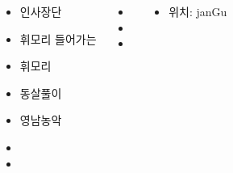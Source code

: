 \documentclass[	20pt, 
							a1paper, 
							portrait, %
							margin=0mm, %
							innermargin=10mm,  		%
							colspace=5mm, 
							subcolspace=0mm
							]{tikzposter}
\begin{document}
\begin{columns}


			{
				\begin{LARGE}
					\begin{itemize}
					\item 인사장단
					\item 휘모리 들어가는
					\item 휘모리
					\item 동살풀이
					\item 영남농악
					\item 
					\item 
					\end{itemize}
				\end{LARGE}
			}



			{
				\begin{LARGE}
					\begin{itemize}
					\item 
					\item 
					\item 
					\end{itemize}
				\end{LARGE}
			}


			{
				\begin{LARGE}
					\begin{itemize}
					\item  위치: janGu
					\end{itemize}
				\end{LARGE}
			} %



	\end{columns}
\end{document}
